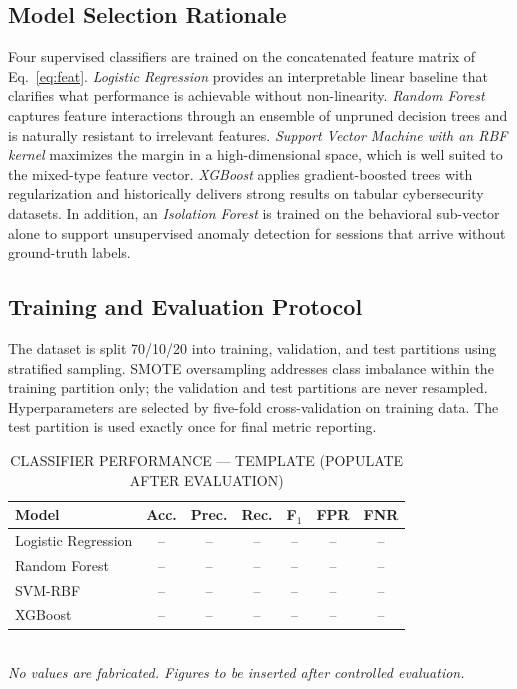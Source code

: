 \documentclass[conference]{IEEEtran}
\begin{document}
\subsection{Model Selection Rationale}
Four supervised classifiers are trained on the concatenated feature matrix of Eq.~\eqref{eq:feat}.
\textit{Logistic Regression} provides an interpretable linear baseline that clarifies what
performance is achievable without non-linearity.
\textit{Random Forest} captures feature interactions through an ensemble of unpruned decision
trees and is naturally resistant to irrelevant features.
\textit{Support Vector Machine with an RBF kernel} maximizes the margin in a high-dimensional
space, which is well suited to the mixed-type feature vector.
\textit{XGBoost} applies gradient-boosted trees with regularization and historically delivers
strong results on tabular cybersecurity datasets.
In addition, an \textit{Isolation Forest} is trained on the behavioral sub-vector alone to
support unsupervised anomaly detection for sessions that arrive without ground-truth labels.

\subsection{Training and Evaluation Protocol}
The dataset is split 70/10/20 into training, validation, and test partitions using stratified
sampling.
SMOTE oversampling addresses class imbalance within the training partition only; the validation
and test partitions are never resampled.
Hyperparameters are selected by five-fold cross-validation on training data.
The test partition is used exactly once for final metric reporting.

\begin{table}[!t]
\caption{CLASSIFIER PERFORMANCE --- TEMPLATE (POPULATE AFTER EVALUATION)}
\label{tab:models}
\centering
\scriptsize
\setlength{\tabcolsep}{3pt}
\begin{tabular}{|l|c|c|c|c|c|c|}
\hline
\textbf{Model} & \textbf{Acc.} & \textbf{Prec.} & \textbf{Rec.} & \textbf{F$_1$} & \textbf{FPR} & \textbf{FNR} \\ \hline
Logistic Regression & -- & -- & -- & -- & -- & -- \\ \hline
Random Forest       & -- & -- & -- & -- & -- & -- \\ \hline
SVM-RBF             & -- & -- & -- & -- & -- & -- \\ \hline
XGBoost             & -- & -- & -- & -- & -- & -- \\ \hline
\end{tabular}
\\\vspace{2pt}\scriptsize\textit{No values are fabricated.  Figures to be inserted after controlled evaluation.}
\end{table}
\end{document}
